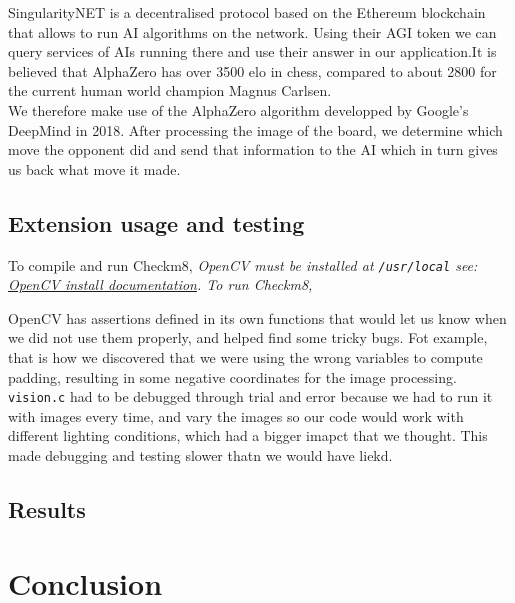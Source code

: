\documentclass[11pt]{article}
\begin{document}
SingularityNET is a decentralised protocol based on the Ethereum blockchain that
allows to run AI algorithms on the network. Using their AGI token we can query
services of AIs running there and use their answer in our application.It is
believed that AlphaZero has over 3500 elo in chess, compared to about 2800 for
the current human world champion Magnus Carlsen.\\ We therefore make use of the
AlphaZero algorithm developped by Google's DeepMind in 2018. After processing
the image of the board, we determine which move the opponent did and send that
information to the AI which in turn gives us back what move it made.

\subsection{Extension usage and testing}
To compile and run Checkm8, \em OpenCV \em must be installed at
\texttt{/usr/local} see:
\href{https://docs.opencv.org/3.4.6/d7/d9f/tutorial_linux_install.html}{OpenCV install documentation}.
To run Checkm8, %


OpenCV has assertions defined in its own functions that would let us 
know when we did not use them properly, and helped find some tricky bugs.
Fot example, that is how we discovered that we were using the wrong variables
to compute padding, resulting in some negative coordinates for the image
processing.
\texttt{vision.c} had to be debugged through trial and error because we
had to run it with images every time, and vary the images so our code would
work with different lighting conditions, which had a bigger imapct that we 
thought. This made debugging and testing slower thatn we would have liekd.
\subsection{Results}
\section{Conclusion}
\end{document}
